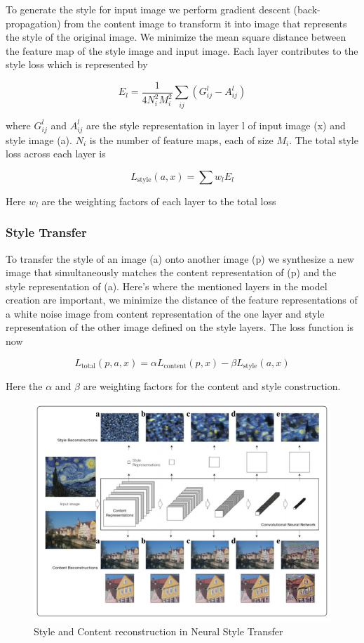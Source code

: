 \documentclass[preprint,12pt]{elsarticle}
\begin{document}
To generate the style for input image we perform gradient descent (back-propagation) from the content image to transform it into image that represents the style of the original image. We minimize the mean square distance between the feature map of the style image and input image. Each layer contributes to the style loss which is represented by

\begin{equation}
E_{l}=\frac{1}{4 N_{i}^{2} M_{i}^{2}} \sum_{i j}\left(G_{i j}^{l}-A_{i j}^{l}\right)
\end{equation}

where $G_{ij}^{l}$  and $A_{ij}^{l}$  are the style representation in layer l of input image (x) and style image (a). $N_{i}$ is the number of feature maps, each of size $M_{i}$. The total style loss across each layer is

\begin{equation}
L_{\text {style}}(a, x)=\sum w_{l} E_{l}
\end{equation}

Here $w_{l}$ are the weighting factors of each layer to the total loss

\subsubsection{Style Transfer}
To transfer the style of an image (a) onto another image (p) we synthesize a new image that simultaneously matches the content representation of (p) and the style representation of (a). Here’s where the mentioned layers in the model creation are important, we minimize the distance of the feature representations of a white noise image from content representation of the one layer and style representation of the other image defined on the style layers. The loss function is now

\begin{equation}
L_{\text {total}}(p, a, x)=\alpha L_{\text {content}}(p, x)-\beta L_{\text {style}}(a, x)
\end{equation}

Here the $\alpha$ and $\beta$ are weighting factors for the content and style construction.

\begin{figure}[ht]
\centering\includegraphics[width=0.7\linewidth]{nst.png}
\caption{Style and Content reconstruction in Neural Style Transfer}
\label{fig:nst}
\end{figure}
\end{document}
